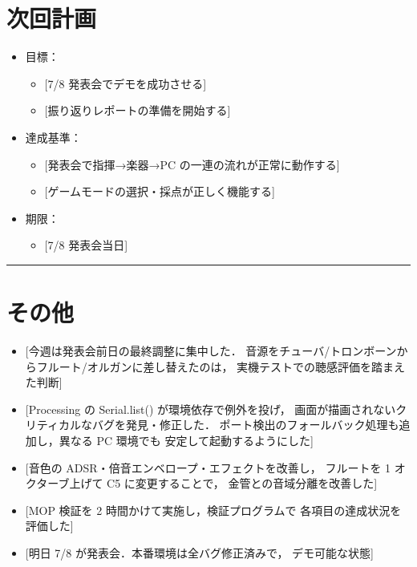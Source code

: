 \documentclass[uplatex,dvipdfmx,a4paper,11pt]{jsarticle}
\newcommand{\sectionrule}{\par\medskip\noindent\rule{\linewidth}{0.6pt}\par\medskip}
\begin{document}
\section{次回計画}

\begin{itemize}
  \item 目標：
    \begin{itemize}
      \item {}[7/8 発表会でデモを成功させる]
      \item {}[振り返りレポートの準備を開始する]
    \end{itemize}
  \item 達成基準：
    \begin{itemize}
      \item {}[発表会で指揮→楽器→PC の一連の流れが正常に動作する]
      \item {}[ゲームモードの選択・採点が正しく機能する]
    \end{itemize}
  \item 期限：
    \begin{itemize}
      \item {}[7/8 発表会当日]
    \end{itemize}
\end{itemize}

\sectionrule

\section{その他}

\begin{itemize}
  \item {}[今週は発表会前日の最終調整に集中した．
        音源をチューバ/トロンボーンからフルート/オルガンに差し替えたのは，
        実機テストでの聴感評価を踏まえた判断]
  \item {}[Processing の Serial.list() が環境依存で例外を投げ，
        画面が描画されないクリティカルなバグを発見・修正した．
        ポート検出のフォールバック処理も追加し，異なる PC 環境でも
        安定して起動するようにした]
  \item {}[音色の ADSR・倍音エンベロープ・エフェクトを改善し，
        フルートを 1 オクターブ上げて C5 に変更することで，
        金管との音域分離を改善した]
  \item {}[MOP 検証を 2 時間かけて実施し，検証プログラムで
        各項目の達成状況を評価した]
  \item {}[明日 7/8 が発表会．本番環境は全バグ修正済みで，
        デモ可能な状態]
\end{itemize}
\end{document}
